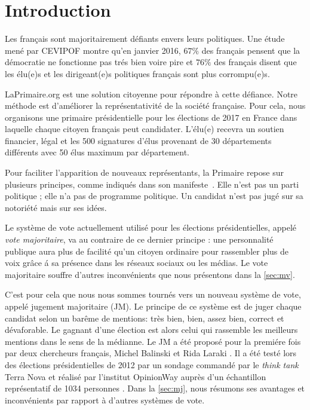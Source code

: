 \documentclass[conference]{IEEEtran}
\begin{document}



\section{Introduction}
\label{sec:intro}

Les fran\c{c}ais sont majoritairement d\'efiants envers leurs politiques. 
Une \'etude men\'e par CEVIPOF \cite{cevipof2016} montre qu'en janvier 2016, $67\%$ des fran\c{c}ais pensent que la d\'emocratie ne fonctionne pas tr\'es bien voire pire et $76\%$ des fran\c{c}ais disent que les \'elu(e)s et les dirigeant(e)s politiques fran\c{c}ais sont plus corrompu(e)s. 

LaPrimaire.org est une solution citoyenne pour r\'epondre \`a cette d\'efiance. 
Notre m\'ethode est d'am\'eliorer la repr\'esentativit\'e de la soci\'et\'e fran\c{c}aise. Pour cela, nous organisons une primaire pr\'esidentielle pour les \'elections de 2017 en France dans laquelle chaque citoyen fran\c{c}ais peut candidater. L'\'elu(e) recevra un soutien financier, l\'egal et les 500 signatures d'\'elus provenant de 30 d\'epartements diff\'erents avec 50 \'elus maximum par d\'epartement.

Pour faciliter l'apparition de nouveaux repr\'esentants, la Primaire repose sur plusieurs principes, comme indiqu\'es dans son manifeste~\cite{manifeste}. Elle n'est pas un parti politique ; elle n'a pas de programme politique. Un candidat n'est pas jug\'e sur sa notori\'et\'e mais sur ses id\'ees.

Le syst\`eme de vote actuellement utilis\'e pour les \'elections pr\'esidentielles, appel\'e \emph{vote majoritaire}, va au contraire de ce dernier principe : une personnalit\'e publique aura plus de facilit\'e qu'un citoyen ordinaire pour rassembler plus de voix gr\^ace \'a sa pr\'esence dans les r\'eseaux sociaux ou les m\'edias. Le vote majoritaire souffre d'autres inconv\'enients que nous pr\'esentons dans la \cref{sec:mv}. 

C'est pour cela que nous nous sommes tourn\'es vers un nouveau syst\`eme de vote, appel\'e jugement majoritaire (JM). Le principe de ce syst\`eme est de juger chaque candidat selon un bar\^eme de mentions: tr\`es bien, bien, assez bien, correct et d\'evaforable. Le gagnant d'une \'election est alors celui qui rassemble les meilleurs mentions dans le sens de la m\'edianne.  Le JM a \'et\'e propos\'e pour la premi\'ere fois par deux chercheurs fran\c{c}ais, Michel Balinski et Rida Laraki \cite{balinski2010majority}.  Il a \'et\'e test\'e lors des \'elections pr\'esidentielles de 2012 par un sondage command\'e par le \emph{think tank} Terra Nova  et r\'ealis\'e par l'institut OpinionWay aupr\`es d'un \'echantillon repr\'esentatif de 1034 personnes \cite{balinski2012rendre}. Dans la \cref{sec:mj}, nous r\'esumons ses avantages et inconv\'enients par rapport \`a d'autres syst\`emes de vote. 
\end{document}
